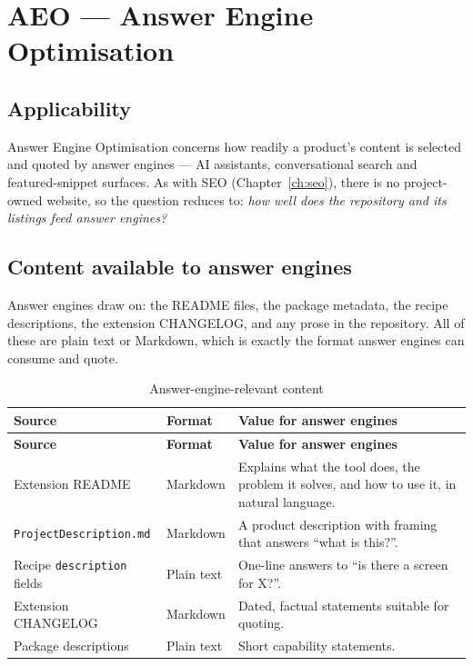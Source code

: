 \chapter{AEO --- Answer Engine Optimisation}
\label{ch:aeo}

\section{Applicability}

Answer Engine Optimisation concerns how readily a product's content is selected
and quoted by answer engines --- AI assistants, conversational search and
featured-snippet surfaces. As with SEO (Chapter~\ref{ch:seo}), there is no
project-owned website, so the question reduces to: \emph{how well does the
repository and its listings feed answer engines?}

\section{Content available to answer engines}

Answer engines draw on: the README files, the package metadata, the recipe
descriptions, the extension CHANGELOG, and any prose in the repository. All of
these are plain text or Markdown, which is exactly the format answer engines can
consume and quote.

\begin{longtable}{@{}L{4.4cm}L{3.2cm}L{6.6cm}@{}}
\caption{Answer-engine-relevant content}\\
\toprule
\textbf{Source} & \textbf{Format} & \textbf{Value for answer engines} \\
\midrule
\endfirsthead
\toprule
\textbf{Source} & \textbf{Format} & \textbf{Value for answer engines} \\
\midrule
\endhead
Extension README & Markdown & Explains what the tool does, the problem it solves,
and how to use it, in natural language. \\
\texttt{ProjectDescription.md} & Markdown & A product description with framing that
answers ``what is this?''. \\
Recipe \texttt{description} fields & Plain text & One-line answers to ``is there a
screen for X?''. \\
Extension CHANGELOG & Markdown & Dated, factual statements suitable for quoting. \\
Package descriptions & Plain text & Short capability statements. \\
\bottomrule
\end{longtable}

